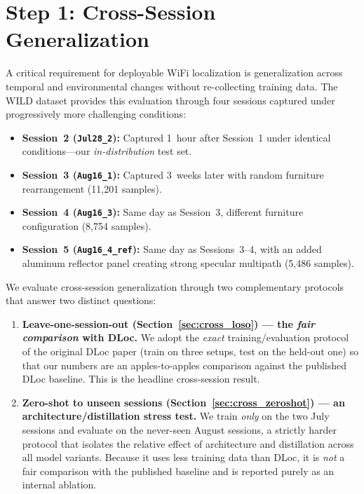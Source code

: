 \documentclass[11pt,a4paper]{article}
\begin{document}
\section{Step 1: Cross-Session Generalization}
\label{sec:cross_session}

A critical requirement for deployable WiFi localization is generalization across temporal and environmental changes without re-collecting training data.
The WILD dataset provides this evaluation through four sessions captured under progressively more challenging conditions:

\begin{itemize}[nosep]
  \item \textbf{Session~2 (\texttt{Jul28\_2}):} Captured 1~hour after Session~1 under identical conditions---our \emph{in-distribution} test set.
  \item \textbf{Session~3 (\texttt{Aug16\_1}):} Captured 3~weeks later with random furniture rearrangement (11{,}201 samples).
  \item \textbf{Session~4 (\texttt{Aug16\_3}):} Same day as Session~3, different furniture configuration (8{,}754 samples).
  \item \textbf{Session~5 (\texttt{Aug16\_4\_ref}):} Same day as Sessions~3--4, with an added aluminum reflector panel creating strong specular multipath (5{,}486 samples).
\end{itemize}

We evaluate cross-session generalization through two complementary protocols that answer two distinct questions:
\begin{enumerate}[nosep]
  \item \textbf{Leave-one-session-out (Section~\ref{sec:cross_loso}) --- the \emph{fair comparison} with DLoc.} We adopt the \emph{exact} training/evaluation protocol of the original DLoc paper (train on three setups, test on the held-out one) so that our numbers are an apples-to-apples comparison against the published DLoc baseline. This is the headline cross-session result.
  \item \textbf{Zero-shot to unseen sessions (Section~\ref{sec:cross_zeroshot}) --- an architecture/distillation stress test.} We train \emph{only} on the two July sessions and evaluate on the never-seen August sessions, a strictly harder protocol that isolates the relative effect of architecture and distillation across all model variants. Because it uses less training data than DLoc, it is \emph{not} a fair comparison with the published baseline and is reported purely as an internal ablation.
\end{enumerate}
\end{document}
